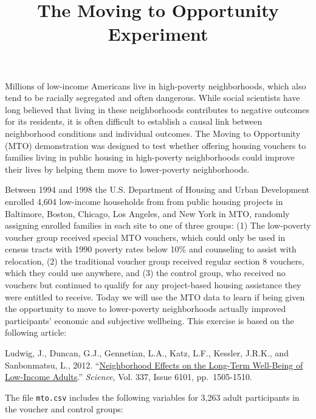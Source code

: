 \documentclass[]{article}
\title{The Moving to Opportunity Experiment}
\author{}
\date{}
\begin{document}
\maketitle


Millions of low-income Americans live in high-poverty neighborhoods,
which also tend to be racially segregated and often dangerous. While
social scientists have long believed that living in these neighborhoods
contributes to negative outcomes for its residents, it is often
difficult to establish a causal link between neighborhood conditions and
individual outcomes. The Moving to Opportunity (MTO) demonstration was
designed to test whether offering housing vouchers to families living in
public housing in high-poverty neighborhoods could improve their lives
by helping them move to lower-poverty neighborhoods.

Between 1994 and 1998 the U.S. Department of Housing and Urban
Development enrolled 4,604 low-income households from from public
housing projects in Baltimore, Boston, Chicago, Los Angeles, and New
York in MTO, randomly assigning enrolled families in each site to one of
three groups: (1) The low-poverty voucher group received special MTO
vouchers, which could only be used in census tracts with 1990 poverty
rates below 10\% and counseling to assist with relocation, (2) the
traditional voucher group received regular section 8 vouchers, which
they could use anywhere, and (3) the control group, who received no
vouchers but continued to qualify for any project-based housing
assistance they were entitled to receive. Today we will use the MTO data
to learn if being given the opportunity to move to lower-poverty
neighborhoods actually improved participants' economic and subjective
wellbeing. This exercise is based on the following article:

Ludwig, J., Duncan, G.J., Gennetian, L.A., Katz, L.F., Kessler, J.R.K.,
and Sanbonmatsu, L., 2012.
``\href{https://dx.doi.org/10.1126/science.1224648}{Neighborhood Effects
on the Long-Term Well-Being of Low-Income Adults}.'' \emph{Science},
Vol. 337, Issue 6101, pp.~1505-1510.

The file \texttt{mto.csv} includes the following variables for 3,263
adult participants in the voucher and control groups:
\end{document}
